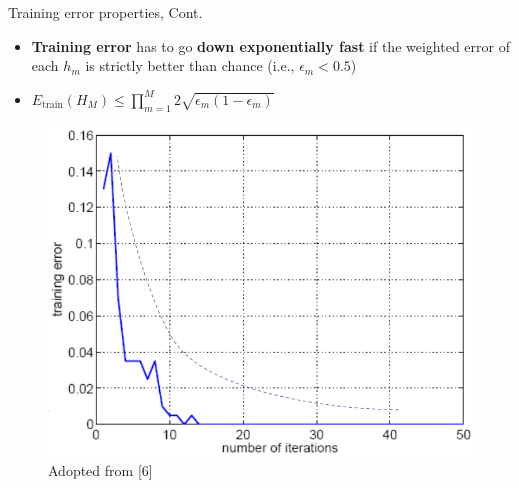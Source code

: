 \documentclass[serif, aspectratio=169]{beamer}
\begin{document}
\begin{frame}{Training error properties, Cont.}
    \begin{itemize}
        \itemsep1em
        \justifying
        \item \textbf{Training error} has to go \textbf{down exponentially fast} if the weighted error of each $h_m$ is strictly better than chance (i.e., $\epsilon_m < 0.5$)
        \item[] \begin{center}
            $E_{\text{train}}(H_M) \leq \displaystyle\prod_{m=1}^M 2\sqrt{\epsilon_m (1 - \epsilon_m)}$
        \end{center}
    \end{itemize}
    \vfill
    \begin{center}
        \begin{figure}
            \includegraphics[width=\textwidth]{pic/boosting_trainexp.png}
            {\scriptsize Adopted from [6]}
        \end{figure}
        \endminipage
    \end{center}
\end{frame}
\end{document}
